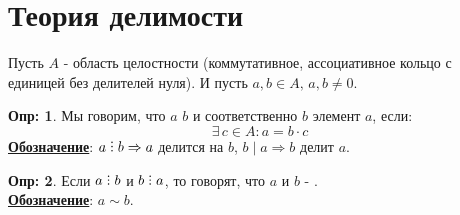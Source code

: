 \documentclass[12pt]{article}
\newcommand{\RN}[1]{%
	\textup{\uppercase\expandafter{\romannumeral#1}}%
}
\theoremstyle{definition}
\newtheorem{defn}{Опр:}
\DeclareRobustCommand{\divby}{%
	\mathrel{\text{\vbox{\baselineskip.65ex\lineskiplimit0pt\hbox{.}\hbox{.}\hbox{.}}}}%
}
\begin{document}
\lhead{Алгебра-\RN{1}}

\section*{Теория делимости}
Пусть $A$ - область целостности (коммутативное, ассоциативное кольцо с единицей без делителей нуля). И пусть $a,b \in A, \, a,b \neq 0$.
\begin{defn}
	Мы говорим, что $a$  $b$ и соответственно $b$  элемент $a$, если:
	$$
		\exists \, c \in A \colon a = b{\cdot}c
	$$
	\textbf{\uline{Обозначение}}: $a\divby b \Rightarrow a$ делится на $b$, $b \mid a \Rightarrow b$ делит $a$. 
\end{defn}
\begin{defn}
	Если $a \divby b$ и $b \divby a$, то говорят, что $a$ и $b$ - .\\
	\textbf{\uline{Обозначение}}: $a \sim b$.
\end{defn}
\end{document}
